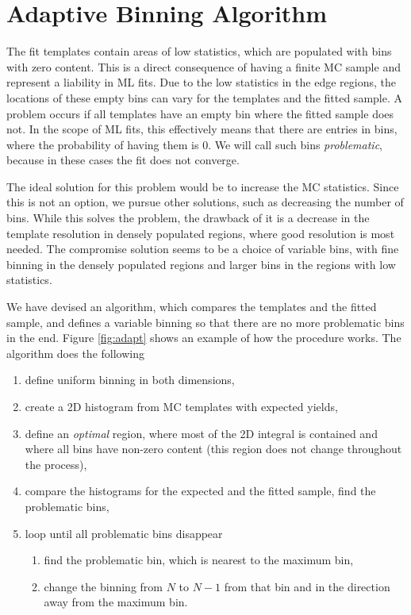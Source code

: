 \section{Adaptive Binning Algorithm}\label{sec:adaptive-binning-algorithm}

The fit templates contain areas of low statistics, which are populated with bins with zero content. This is a direct consequence of having a finite MC sample and represent a liability in ML fits. Due to the low statistics in the edge regions, the locations of these empty bins can vary for the templates and the fitted sample. A problem occurs if all templates have an empty bin where the fitted sample does not. In the scope of ML fits, this effectively means that there are entries in bins, where the probability of having them is $0$. We will call such bins \textit{problematic}, because in these cases the fit does not converge.

The ideal solution for this problem would be to increase the MC statistics. Since this is not an option, we pursue other solutions, such as decreasing the number of bins. While this solves the problem, the drawback of it is a decrease in the template resolution in densely populated regions, where good resolution is most needed. The compromise solution seems to be a choice of variable bins, with fine binning in the densely populated regions and larger bins in the regions with low statistics.

We have devised an algorithm, which compares the templates and the fitted sample, and defines a variable binning so that there are no more problematic bins in the end. Figure \ref{fig:adapt} shows an example of how the procedure works. The algorithm does the following
\begin{enumerate}
	\item define uniform binning in both dimensions,
	\item create a 2D histogram from MC templates with expected yields,
	\item define an \textit{optimal} region, where most of the 2D integral is contained and where all bins have non-zero content (this region does not change throughout the process),
	\item compare the histograms for the expected and the fitted sample, find the problematic bins,
	\item loop until all problematic bins disappear
	\begin{enumerate}
		\item find the problematic bin, which is nearest to the maximum bin,
		\item change the binning from $N$ to $N-1$ from that bin and in the direction away from the maximum bin.
	\end{enumerate}
\end{enumerate}

